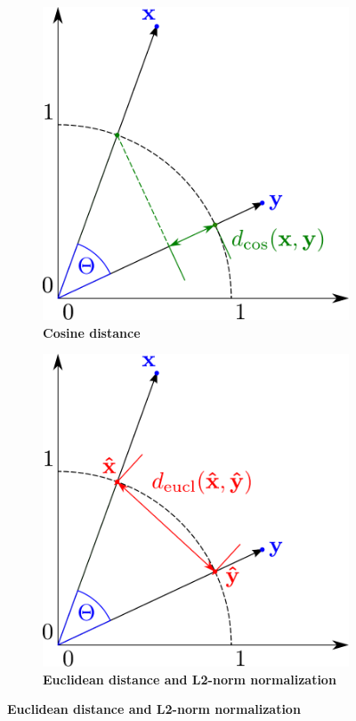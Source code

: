 \begin{figure}[!hbt]
    \centering
    \begin{subfigure}[b]{0.475\textwidth}
        \caption[Cosine distance]{\textbf{Cosine distance}}
        \label{subfig:Chord}
        \includegraphics[width=\textwidth]{Graphics/Chord.pdf}
    \end{subfigure}
    \hfill
    \begin{subfigure}[b]{0.475\textwidth}
        \caption[L2]{\textbf{Euclidean distance and L2-norm normalization}}
        \label{subfig:L2}            
        \includegraphics[width=\textwidth]{Graphics/L2.pdf}

\end{subfigure}
\end{figure}
